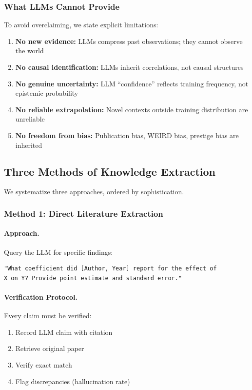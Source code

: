 \subsubsection{What LLMs Cannot Provide}

To avoid overclaiming, we state explicit limitations:

\begin{enumerate}
    \item \textbf{No new evidence:} LLMs compress past observations; they cannot observe the world
    \item \textbf{No causal identification:} LLMs inherit correlations, not causal structures
    \item \textbf{No genuine uncertainty:} LLM ``confidence'' reflects training frequency, not epistemic probability
    \item \textbf{No reliable extrapolation:} Novel contexts outside training distribution are unreliable
    \item \textbf{No freedom from bias:} Publication bias, WEIRD bias, prestige bias are inherited
\end{enumerate}

\subsection{Three Methods of Knowledge Extraction}

We systematize three approaches, ordered by sophistication.

\subsubsection{Method 1: Direct Literature Extraction}

\paragraph{Approach.}
Query the LLM for specific findings:

\begin{verbatim}
"What coefficient did [Author, Year] report for the effect of 
X on Y? Provide point estimate and standard error."
\end{verbatim}

\paragraph{Verification Protocol.}
Every claim must be verified:
\begin{enumerate}
    \item Record LLM claim with citation
    \item Retrieve original paper
    \item Verify exact match
    \item Flag discrepancies (hallucination rate)
\end{enumerate}

